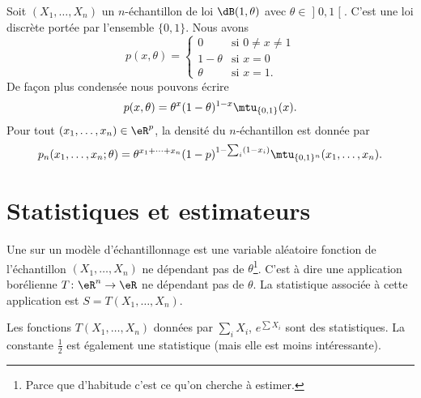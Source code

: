 \begin{example}
    Soit \( (X_1,\ldots,X_n)\) un \( n\)-échantillon de loi \( \dB(1,\theta)\) avec \( \theta\in\mathopen] 0 , 1 \mathclose[\). C'est une loi discrète portée par l'ensemble \( \{ 0,1 \}\). Nous avons
    \begin{equation}
        p(x,\theta)=\begin{cases}
            0    &   \text{si } 0\neq x\neq 1\\
            1-\theta    &   \text{si } x=0\\
            \theta    &    \text{si } x=1\text{.}
        \end{cases}
    \end{equation}
    De façon plus condensée nous pouvons écrire 
    \begin{equation}
        p(x,\theta)=\theta^x(1-\theta)^{1-x}\mtu_{\{ 0,1 \}}(x).
    \end{equation}
    Pour tout \( (x_1,\ldots,x_n)\in\eR^p\), la densité du \( n\)-échantillon est donnée par
    \begin{equation}
        p_n(x_1,\ldots,x_n;\theta)=\theta^{x_1+\cdots+x_n}(1-p)^{1-\sum_i(1-x_i)}\mtu_{\{ 0,1 \}^n}(x_1,\ldots,x_n).
    \end{equation}
\end{example}

\section{Statistiques et estimateurs}

\begin{definition}
    Une  sur un modèle d'échantillonnage est une variable aléatoire fonction de l'échantillon \( (X_1,\ldots,X_n)\) ne dépendant pas de \( \theta\)\footnote{Parce que d'habitude c'est ce qu'on cherche à estimer.}. C'est à dire une application borélienne \( T\colon \eR^n\to \eR\) ne dépendant pas de \( \theta\). La statistique associée à cette application est $S=T(X_1,\ldots,X_n)$.
\end{definition}

Les fonctions \( T(X_1,\ldots,X_n)\) données par \( \sum_iX_i\), \(  e^{\sum X_i}\) sont des statistiques. La constante \( \frac{ 1 }{2}\) est également une statistique (mais elle est moins intéressante).

